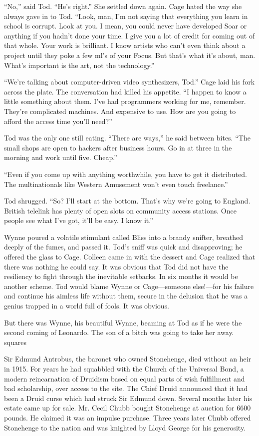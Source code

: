 “No,” said Tod. “He’s right.” She settled down again. Cage hated the way she always gave in to Tod. “Look, man, I’m not saying that everything you learn in school is corrupt. Look at you. I mean, you could never have developed Soar or anything if you hadn’t done your time. I give you a lot of credit for coming out of that whole. Your work is brilliant. I know artists who can’t even think about a project until they poke a few ml’s of your Focus. But that’s what it’s about, man. What’s important is the art, not the technology.”

“We’re talking about computer-driven video synthesizers, Tod.” Cage laid his fork across the plate. The conversation had killed his appetite. “I happen to know a little something about them. I’ve had programmers working for me, remember. They’re complicated machines. And expensive to use. How are you going to afford the access time you’ll need?”

Tod was the only one still eating. “There are ways,” he said between bites. “The small shops are open to hackers after business hours. Go in at three in the morning and work until five. Cheap.”

“Even if you come up with anything worthwhile, you have to get it distributed. The multinationals like Western Amusement won’t even touch freelance.”

Tod shrugged. “So? I’ll start at the bottom. That’s why we’re going to England. British telelink has plenty of open slots on community access stations. Once people see what I’ve got, it’ll be easy. I know it.”

Wynne poured a volatile stimulant called Bliss into a brandy snifter, breathed deeply of the fumes, and passed it. Tod’s sniff was quick and disapproving; he offered the glass to Cage. Colleen came in with the dessert and Cage realized that there was nothing he could say. It was obvious that Tod did not have the resiliency to fight through the inevitable setbacks. In six months it would be another scheme. Tod would blame Wynne or Cage—someone else!—for his failure and continue his aimless life without them, secure in the delusion that he was a genius trapped in a world full of fools. It was obvious.

But there was Wynne, his beautiful Wynne, beaming at Tod as if he were the second coming of Leonardo. The son of a bitch was going to take her away.
squares

Sir Edmund Antrobus, the baronet who owned Stonehenge, died without an heir in 1915. For years he had squabbled with the Church of the Universal Bond, a modern reincarnation of Druidism based on equal parts of wish fulfillment and bad scholarship, over access to the site. The Chief Druid announced that it had been a Druid curse which had struck Sir Edmund down. Several months later his estate came up for sale. Mr. Cecil Chubb bought Stonehenge at auction for 6600 pounds. He claimed it was an impulse purchase. Three years later Chubb offered Stonehenge to the nation and was knighted by Lloyd George for his generosity.

